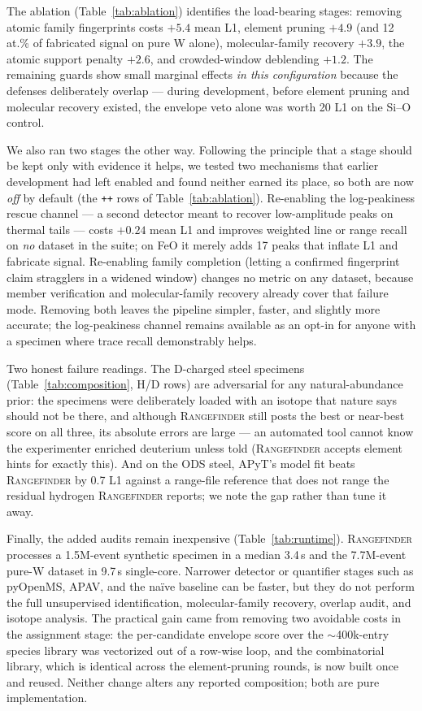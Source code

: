 \documentclass[11pt]{article}
\newcommand{\rf}{\textsc{Rangefinder}}
\begin{document}
The ablation (Table~\ref{tab:ablation}) identifies the load-bearing
stages: removing atomic family fingerprints costs $+5.4$ mean L1, element
pruning $+4.9$ (and 12\,at.\% of fabricated signal on pure W alone),
molecular-family recovery $+3.9$, the atomic support penalty $+2.6$, and
crowded-window deblending $+1.2$. The remaining guards show small marginal
effects \emph{in this configuration} because the defenses deliberately
overlap --- during development, before element pruning and molecular
recovery existed, the envelope veto alone was worth 20 L1 on the Si--O
control.

We also ran two stages the other way. Following the principle that a stage
should be kept only with evidence it helps, we tested two mechanisms that
earlier development had left enabled and found neither earned its place, so
both are now \emph{off} by default (the \texttt{++} rows of
Table~\ref{tab:ablation}). Re-enabling the log-peakiness rescue channel ---
a second detector meant to recover low-amplitude peaks on thermal tails ---
costs $+0.24$ mean L1 and improves weighted line or range recall on
\emph{no} dataset in the suite; on FeO it merely adds 17 peaks that inflate
L1 and fabricate signal. Re-enabling family completion (letting a confirmed
fingerprint claim stragglers in a widened window) changes no metric on any
dataset, because member verification and molecular-family recovery already
cover that failure mode. Removing both leaves the pipeline simpler, faster,
and slightly more accurate; the log-peakiness channel remains available as
an opt-in for anyone with a specimen where trace recall demonstrably helps.

Two honest failure readings. The D-charged steel specimens
(Table~\ref{tab:composition}, H/D rows) are adversarial for any
natural-abundance prior: the specimens were deliberately loaded with an
isotope that nature says should not be there, and although \rf{} still
posts the best or near-best score on all three, its absolute errors are
large --- an automated tool cannot know the experimenter enriched
deuterium unless told (\rf{} accepts element hints for exactly this).
And on the ODS steel, APyT's model fit beats \rf{} by 0.7 L1 against a
range-file reference that does not range the residual hydrogen \rf{}
reports; we note the gap rather than tune it away.

Finally, the added audits remain inexpensive (Table~\ref{tab:runtime}). \rf{}
processes a 1.5M-event synthetic specimen in a median 3.4\,s and the
7.7M-event pure-W dataset in 9.7\,s single-core. Narrower detector or
quantifier stages such as pyOpenMS, APAV, and the na\"ive baseline can be
faster, but they do not perform the full unsupervised identification,
molecular-family recovery, overlap audit, and isotope analysis. The practical
gain came from removing two
avoidable costs in the assignment stage: the per-candidate envelope score
over the ${\sim}$400k-entry species library was vectorized out of a
row-wise loop, and the combinatorial library, which is identical across the
element-pruning rounds, is now built once and reused. Neither change alters
any reported composition; both are pure implementation.
\end{document}
